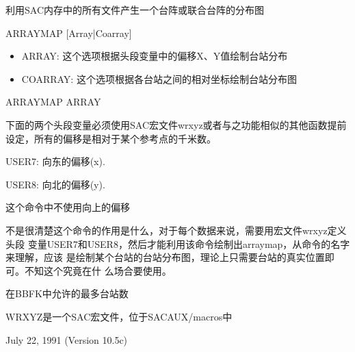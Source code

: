\label{cmd:arraymap}

利用SAC内存中的所有文件产生一个台阵或联合台阵的分布图

ARRAYMAP [Array|Coarray]

\begin{itemize}
\item ARRAY: 这个选项根据头段变量中的偏移X、Y值绘制台站分布
\item COARRAY: 这个选项根据各台站之间的相对坐标绘制台站分布图
\end{itemize}

ARRAYMAP ARRAY

下面的两个头段变量必须使用SAC宏文件wrxyz或者与之功能相似的其他函数提前设定，所有的偏移是相对于某个参考点的千米数。

USER7: 向东的偏移(x).

USER8: 向北的偏移(y).

这个命令中不使用向上的偏移

不是很清楚这个命令的作用是什么，对于每个数据来说，需要用宏文件wrxyz定义头段
变量USER7和USER8，然后才能利用该命令绘制出arraymap，从命令的名字来理解，应该
是绘制某个台站的台站分布图，理论上只需要台站的真实位置即可。不知这个究竟在什
么场合要使用。

在BBFK中允许的最多台站数

WRXYZ是一个SAC宏文件，位于SACAUX/macros中

July 22, 1991 (Version 10.5c)
